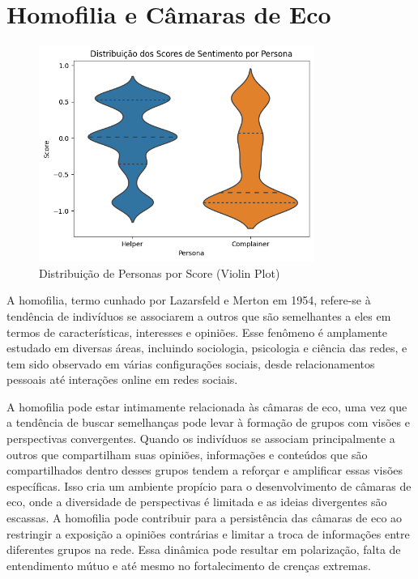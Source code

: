 \section{Homofilia e Câmaras de Eco}

\begin{figure}[htb]
    \centering
    \includegraphics[width=0.8\textwidth]{images/personas_violin.png}
    \caption{Distribuição de Personas por Score (Violin Plot)}
    \label{fig:personas_violin}
\end{figure}

A homofilia, termo cunhado por Lazarsfeld e Merton em 1954, refere-se à tendência de indivíduos se associarem a outros que são semelhantes a eles em termos de características, interesses e opiniões. Esse fenômeno é amplamente estudado em diversas áreas, incluindo sociologia, psicologia e ciência das redes, e tem sido observado em várias configurações sociais, desde relacionamentos pessoais até interações online em redes sociais.

A homofilia pode estar intimamente relacionada às câmaras de eco, uma vez que a tendência de buscar semelhanças pode levar à formação de grupos com visões e perspectivas convergentes. Quando os indivíduos se associam principalmente a outros que compartilham suas opiniões, informações e conteúdos que são compartilhados dentro desses grupos tendem a reforçar e amplificar essas visões específicas. Isso cria um ambiente propício para o desenvolvimento de câmaras de eco, onde a diversidade de perspectivas é limitada e as ideias divergentes são escassas. A homofilia pode contribuir para a persistência das câmaras de eco ao restringir a exposição a opiniões contrárias e limitar a troca de informações entre diferentes grupos na rede. Essa dinâmica pode resultar em polarização, falta de entendimento mútuo e até mesmo no fortalecimento de crenças extremas.

